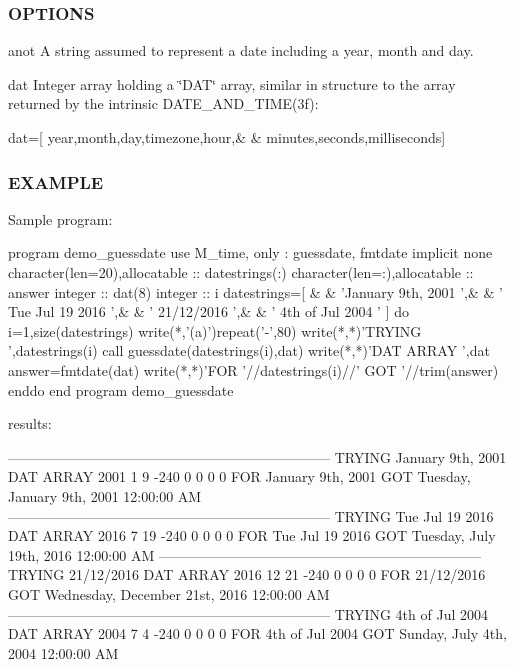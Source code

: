 \subsubsection*{O\+P\+T\+I\+O\+NS}

anot A string assumed to represent a date including a year, month and day.

dat Integer array holding a \char`\"{}\+D\+A\+T\char`\"{} array, similar in structure to the array returned by the intrinsic D\+A\+T\+E\+\_\+\+A\+N\+D\+\_\+\+T\+I\+M\+E(3f)\+: \begin{DoxyVerb}   dat=[ year,month,day,timezone,hour,&
    & minutes,seconds,milliseconds]
\end{DoxyVerb}


\subsubsection*{E\+X\+A\+M\+P\+LE}

\begin{DoxyVerb}Sample program:

 program demo_guessdate
 use M_time, only : guessdate, fmtdate
 implicit none
 character(len=20),allocatable :: datestrings(:)
 character(len=:),allocatable  :: answer
 integer                       :: dat(8)
 integer                       :: i
    datestrings=[ &
    & 'January 9th, 2001   ',&
    & ' Tue Jul 19 2016    ',&
    & ' 21/12/2016         ',&
    & ' 4th of Jul 2004    ' ]
    do i=1,size(datestrings)
       write(*,'(a)')repeat('-',80)
       write(*,*)'TRYING ',datestrings(i)
       call guessdate(datestrings(i),dat)
       write(*,*)'DAT ARRAY ',dat
       answer=fmtdate(dat)
       write(*,*)'FOR '//datestrings(i)//' GOT '//trim(answer)
    enddo
 end program demo_guessdate

results:

 ---------------------------------------------------------------------
 TRYING January 9th, 2001
 DAT ARRAY         2001  1  9   -240    0   0   0    0
 FOR January 9th, 2001  GOT Tuesday, January 9th, 2001 12:00:00 AM
 ---------------------------------------------------------------------
 TRYING  Tue Jul 19 2016
 DAT ARRAY         2016  7  19  -240    0   0   0    0
 FOR  Tue Jul 19 2016   GOT Tuesday, July 19th, 2016 12:00:00 AM
 ---------------------------------------------------------------------
 TRYING  21/12/2016
 DAT ARRAY         2016  12 21  -240    0   0   0    0
 FOR  21/12/2016        GOT Wednesday, December 21st, 2016 12:00:00 AM
 ---------------------------------------------------------------------
 TRYING  4th of Jul 2004
 DAT ARRAY         2004  7  4   -240    0   0   0    0
 FOR  4th of Jul 2004   GOT Sunday, July 4th, 2004 12:00:00 AM
\end{DoxyVerb}


